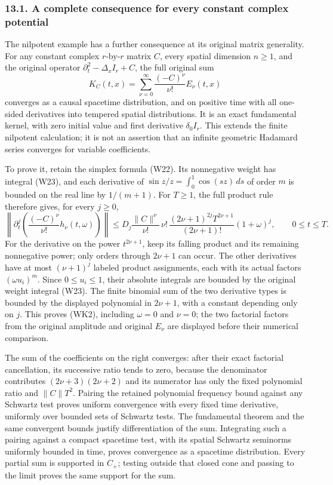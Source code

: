\documentclass[
  11pt,
]{article}
\begin{document}
\subsubsection{13.1. A complete consequence for every constant complex
potential}\label{a-complete-consequence-for-every-constant-complex-potential}

The nilpotent example has a further consequence at its original matrix
generality. For any constant complex \(r\)-by-\(r\) matrix \(C\), every
spatial dimension \(n\geq1\), and the original operator
\(\partial_t^2-\Delta_x I_r+C\), the full original sum \[
 K_C(t,x)=\sum_{\nu=0}^\infty
                      \frac{(-C)^\nu}{\nu!}E_\nu(t,x)
 \tag{WK1}
\] converges as a causal spacetime distribution, and on positive time
with all one-sided derivatives into tempered spatial distributions. It
is an exact fundamental kernel, with zero initial value and first
derivative \(\delta_0I_r\). This extends the finite nilpotent
calculation; it is not an assertion that an infinite geometric Hadamard
series converges for variable coefficients.

To prove it, retain the simplex formula (W22). Its nonnegative weight
has integral (W23), and each derivative of
\(\sin z/z=\int_0^1\cos(sz)\,ds\) of order \(m\) is bounded on the real
line by \(1/(m+1)\). For \(T\geq1\), the full product rule therefore
gives, for every \(j\geq0\), \[
 \left\|\partial_t^j\left(
               \frac{(-C)^\nu}{\nu!}h_\nu(t,\omega)\right)\right\|
 \leq D_j\frac{\|C\|^\nu}{\nu!}\,\nu!\,
       \frac{(2\nu+1)^{2j}T^{2\nu+1}}{(2\nu+1)!}
       (1+\omega)^j,\qquad 0\leq t\leq T.
 \tag{WK2}
\] For the derivative on the power \(t^{2\nu+1}\), keep its falling
product and its remaining nonnegative power; only orders through
\(2\nu+1\) can occur. The other derivatives have at most \((\nu+1)^j\)
labeled product assignments, each with its actual factors
\((\omega u_i)^m\). Since \(0\leq u_i\leq1\), their absolute integrals
are bounded by the original weight integral (W23). The finite binomial
sum of the two derivative types is bounded by the displayed polynomial
in \(2\nu+1\), with a constant depending only on \(j\). This proves
(WK2), including \(\omega=0\) and \(\nu=0\); the two factorial factors
from the original amplitude and original \(E_\nu\) are displayed before
their numerical comparison.

The sum of the coefficients on the right converges: after their exact
factorial cancellation, its successive ratio tends to zero, because the
denominator contributes \((2\nu+3)(2\nu+2)\) and its numerator has only
the fixed polynomial ratio and \(\|C\|T^2\). Pairing the retained
polynomial frequency bound against any Schwartz test proves uniform
convergence with every fixed time derivative, uniformly over bounded
sets of Schwartz tests. The fundamental theorem and the same convergent
bounds justify differentiation of the sum. Integrating such a pairing
against a compact spacetime test, with its spatial Schwartz seminorms
uniformly bounded in time, proves convergence as a spacetime
distribution. Every partial sum is supported in \(C_+\); testing outside
that closed cone and passing to the limit proves the same support for
the sum.
\end{document}
